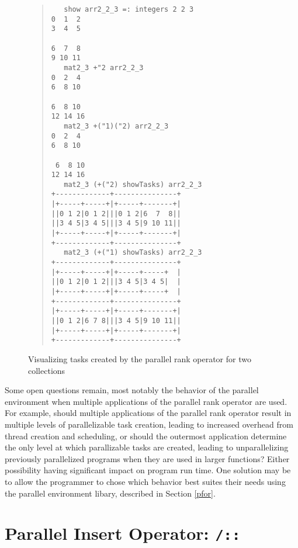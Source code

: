 \begin{figure}[p]
\begin{quote}
\begin{singlespacing}
\begin{small}
\begin{verbatim}
   show arr2_2_3 =: integers 2 2 3
0  1  2
3  4  5

6  7  8
9 10 11
   mat2_3 +"2 arr2_2_3
0  2  4
6  8 10

6  8 10
12 14 16
   mat2_3 +("1)("2) arr2_2_3
0  2  4
6  8 10

 6  8 10
12 14 16
   mat2_3 (+("2) showTasks) arr2_2_3
+-------------+---------------+
|+-----+-----+|+-----+-------+|
||0 1 2|0 1 2|||0 1 2|6  7  8||
||3 4 5|3 4 5|||3 4 5|9 10 11||
|+-----+-----+|+-----+-------+|
+-------------+---------------+
   mat2_3 (+("1) showTasks) arr2_2_3
+-------------+---------------+
|+-----+-----+|+-----+-----+  |
||0 1 2|0 1 2|||3 4 5|3 4 5|  |
|+-----+-----+|+-----+-----+  |
+-------------+---------------+
|+-----+-----+|+-----+-------+|
||0 1 2|6 7 8|||3 4 5|9 10 11||
|+-----+-----+|+-----+-------+|
+-------------+---------------+
\end{verbatim}
\end{small}
\end{singlespacing}
\end{quote}
\label{fig::pr_tasks2}
\caption{Visualizing tasks created by the parallel rank operator for two collections}
\end{figure}

Some open questions remain, most notably 
the behavior of the parallel environment when multiple applications of the parallel rank operator are used. 
For example, should multiple applications of the parallel rank operator result in multiple levels of parallelizable task creation, 
leading to increased overhead from thread creation and scheduling, 
or should the outermost application determine the only level at which parallizable tasks are created, 
leading to unparallelizing previously parallelized programs when they are used in larger functions? 
Either possibility having significant impact on program run time.
One solution may be to allow the programmer to chose which behavior best suites their needs 
using the parallel environment libary, described in Section \ref{pfor}.

\section{Parallel Insert Operator: \texttt{/::}}
\label{pins}
